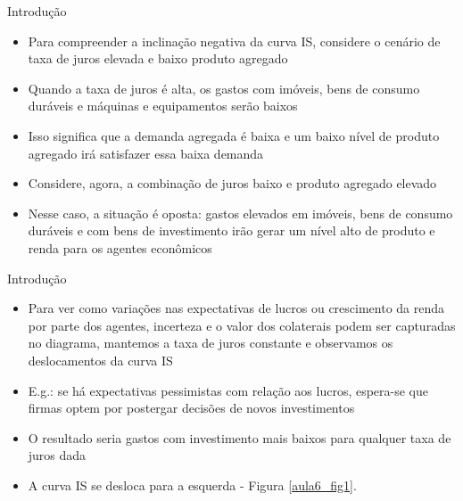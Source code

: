 \documentclass[10pt]{beamer}
\begin{document}
\begin{frame}{Introdução}
    \begin{itemize}
        \item Para compreender a inclinação negativa da curva IS, considere o cenário de taxa de juros elevada e baixo produto agregado\bigskip

        \item Quando a taxa de juros é alta, os gastos com imóveis, bens de consumo duráveis e máquinas e equipamentos serão baixos\bigskip

        \item Isso significa que a demanda agregada é baixa e um baixo nível de produto agregado irá satisfazer essa baixa demanda\bigskip

        \item Considere, agora, a combinação de juros baixo e produto agregado elevado\bigskip

        \item Nesse caso, a situação é oposta: gastos elevados em imóveis, bens de consumo duráveis e com bens de investimento irão gerar um nível alto de produto e renda para os agentes econômicos
    \end{itemize}
\end{frame}

\begin{frame}{Introdução}
    \begin{itemize}
        \item Para ver como variações nas expectativas de lucros ou crescimento da renda por parte dos agentes, incerteza e o valor dos colaterais podem ser capturadas no diagrama, mantemos a taxa de juros constante e observamos os deslocamentos da curva IS\bigskip

        \item E.g.: se há expectativas pessimistas com relação aos lucros, espera-se que firmas optem por postergar decisões de novos investimentos\bigskip

        \item O resultado seria gastos com investimento mais baixos para qualquer taxa de juros dada\bigskip

        \item A curva IS se desloca para a esquerda - Figura \ref{aula6_fig1}.
    \end{itemize}
\end{frame}
\end{document}
